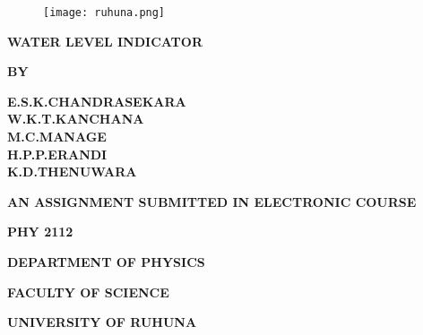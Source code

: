 \documentclass[12pt,a4paper,oneside]{book}
\theoremstyle{plain}
\numberwithin{equation}{chapter} \DeclareMathOperator{\Var}{Var}
\begin{document}
\thispagestyle{empty}

\begin{figure}[h!]
\vskip1in
\begin{center}
\texttt{[image: ruhuna.png]}
\end{center}
\end{figure}

\begin{center}
\large{\textbf{WATER LEVEL INDICATOR}}
\end{center}

\vskip2.5mm

\begin{center}
\textbf{BY}
\end{center}

\vskip0.6cm

\begin{center}
\textbf{E.S.K.CHANDRASEKARA}\\
\textbf{W.K.T.KANCHANA}\\
\textbf{M.C.MANAGE}\\
\textbf{H.P.P.ERANDI}\\
\textbf{K.D.THENUWARA}
\end{center}

\vskip1.0cm
 
\begin{center}
\textbf{AN ASSIGNMENT SUBMITTED IN ELECTRONIC COURSE}
\end{center}

\begin{center}
\textbf{PHY 2112}
\end{center}
\vskip1cm
\begin{center}
\textbf{DEPARTMENT OF PHYSICS}
\end{center}
\begin{center}
\textbf{FACULTY OF SCIENCE}
\end{center}
\begin{center}
\textbf{UNIVERSITY OF RUHUNA}
\end{center}
\end{document}
